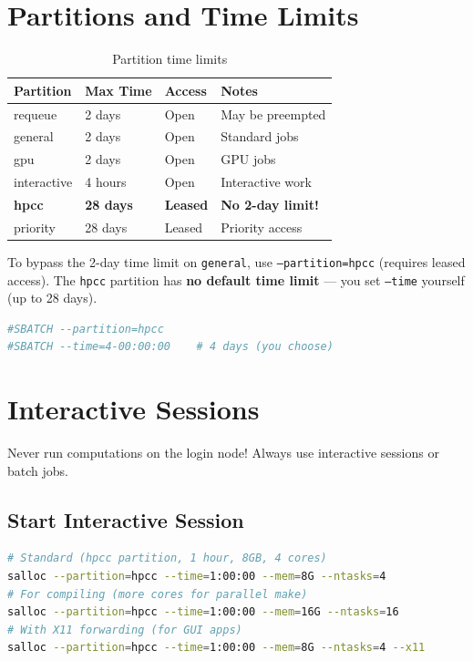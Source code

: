 \documentclass[11pt,a4paper]{article}
\begin{document}
\section{Partitions and Time Limits}
\begin{table}[h]
\centering
\begin{tabular}{@{}llll@{}}
\toprule
\textbf{Partition} & \textbf{Max Time} & \textbf{Access} & \textbf{Notes} \\
\midrule
requeue & 2 days & Open & May be preempted \\
general & 2 days & Open & Standard jobs \\
gpu & 2 days & Open & GPU jobs \\
interactive & 4 hours & Open & Interactive work \\
\textbf{hpcc} & \textbf{28 days} & \textbf{Leased} & \textbf{No 2-day limit!} \\
priority & 28 days & Leased & Priority access \\
\bottomrule
\end{tabular}
\caption{Partition time limits}
\end{table}
\begin{tipbox}
To bypass the 2-day time limit on \texttt{general}, use
\texttt{--partition=hpcc} (requires leased access).
The \texttt{hpcc} partition has \textbf{no default time limit}
--- you set \texttt{--time} yourself (up to 28 days).
\begin{lstlisting}[language=bash]
#SBATCH --partition=hpcc
#SBATCH --time=4-00:00:00    # 4 days (you choose)
\end{lstlisting}
\end{tipbox}
\section{Interactive Sessions}
\begin{warningbox}
Never run computations on the login node! Always use interactive sessions or batch jobs.
\end{warningbox}
\subsection{Start Interactive Session}
\begin{lstlisting}[language=bash]
# Standard (hpcc partition, 1 hour, 8GB, 4 cores)
salloc --partition=hpcc --time=1:00:00 --mem=8G --ntasks=4
# For compiling (more cores for parallel make)
salloc --partition=hpcc --time=1:00:00 --mem=16G --ntasks=16
# With X11 forwarding (for GUI apps)
salloc --partition=hpcc --time=1:00:00 --mem=8G --ntasks=4 --x11
\end{lstlisting}
\end{document}
